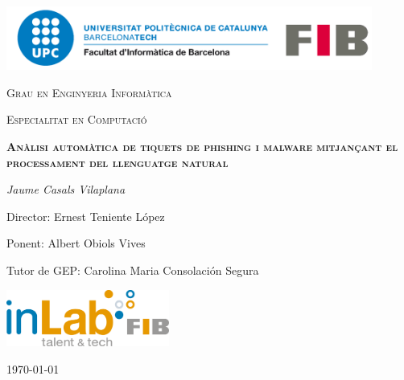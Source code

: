 \begin{titlepage}
    \centering
    \includegraphics[width=0.9\textwidth]{logo-upc-fib.png}
    \par\vspace{0.5cm}
    
    {\scshape\Large Grau en Enginyeria Informàtica\par}
    {\scshape\large Especialitat en Computació\par}
    
    \vspace{4.1cm}
    
    {\scshape\huge\bfseries Anàlisi automàtica de tiquets de phishing i malware mitjançant el processament del llenguatge natural
    }
    
    \vspace{2cm}
    
    {\Large\itshape Jaume Casals Vilaplana\par}
    
    \vfill
    
    Director: Ernest Teniente López\par
    Ponent: Albert Obiols Vives\par
    Tutor de GEP: Carolina Maria Consolación Segura\par
    \vspace{1.5cm}
    \includegraphics[width=0.4\textwidth]{logo-inlab.png}
    \vspace{0.5cm}
    {\par\large\today\par}
    
\end{titlepage}